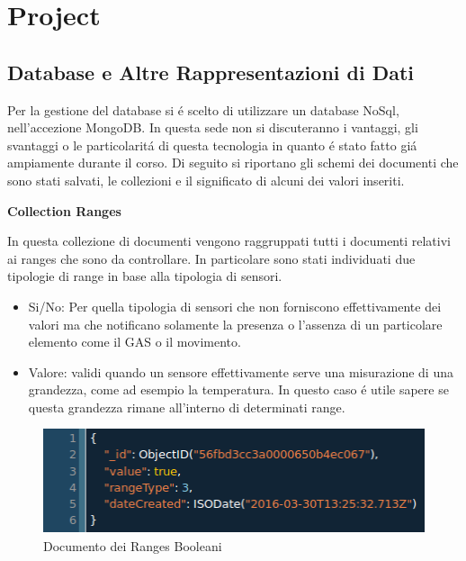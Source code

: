 \section{Project}
\subsection{Database e Altre Rappresentazioni di Dati}
Per la gestione del database si \'e scelto di utilizzare un database NoSql, nell'accezione MongoDB\cite{MongoDB}. In questa sede non si discuteranno i vantaggi, gli svantaggi o le particolarit\'a di questa tecnologia in quanto \'e stato fatto gi\'a ampiamente durante il corso. Di seguito si riportano gli schemi dei documenti che sono stati salvati, le collezioni e il significato di alcuni dei valori inseriti.

\begin{center}
\textbf{Collection Ranges}
\end{center}

In questa collezione di documenti vengono raggruppati tutti i documenti relativi ai ranges che sono da controllare. In particolare sono stati individuati due tipologie di range in base alla tipologia di sensori.

\begin{itemize}
  \item Si/No: Per quella tipologia di sensori che non forniscono effettivamente dei valori ma che notificano solamente la presenza o l'assenza di un particolare elemento come il GAS o il movimento.
  \item  Valore: validi quando un sensore effettivamente serve una misurazione di una grandezza, come ad esempio la temperatura. In questo caso \'e utile sapere se questa grandezza rimane all'interno di determinati range.
\end{itemize}

\begin{figure}[ht]
\centering
\includegraphics[width=\textwidth,natwidth=610,natheight=642]{Figures/DataStructures/RangesBoolean.png}
\caption{Documento dei Ranges Booleani}
\end{figure}


